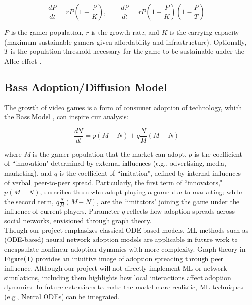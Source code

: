 \documentclass{article}
\begin{document}
\begin{equation}
    \frac{dP}{dt} = rP \left(1 - \frac{P}{K}\right), 
    \qquad \frac{dP}{dt} = rP \left(1 - \frac{P}{K}\right) \left(1 - \frac{P}{T}\right)
\end{equation}

\noindent $P$ is the gamer population, $r$ is the growth rate, and $K$ is the carrying capacity (maximum sustainable gamers given affordability and infrastructure). Optionally, $T$ is the population threshold necessary for the game to be sustainable under the Allee effect \cite{9b04f3dc-918b-391a-9a53-ddc05d360c66}.  

\subsection{Bass Adoption/Diffusion Model}
The growth of video games is a form of consumer adoption of technology, which the Bass Model \cite{916272ae-6b7a-3e62-b7e2-5747187dae7b, f1542a98-16de-3de1-ac28-c48c9779e63f}, can inspire our analysis: 

\begin{equation}
    \frac{dN}{dt} = p \left(M - N\right) + q \frac{N}{M} \left(M - N\right)
\end{equation}

\noindent where $M$ is the gamer population that the market can adopt, $p$ is the coefficient of ``innovation" determined by external influences (e.g., advertising, media, marketing), and $q$ is the coefficient of ``imitation", defined by internal influences of verbal, peer-to-peer spread. Particularly, the first term of ``innovators," $p \left(M - N\right)$, describes those who adopt playing a game due to marketing; while the second term, $ q \frac{N}{M} \left(M - N\right) $, are the ``imitators" joining the game under the influence of current players. Parameter $q$ reflects how adoption spreads across social networks, envisioned through graph theory. \\ 


\noindent Though our project emphasizes classical ODE-based models, ML methods such as (ODE-based) neural network adoption models are applicable in future work to encapsulate nonlinear adoption dynamics with more complexity. Graph theory in Figure\textbf{(1)} provides an intuitive image of adoption spreading through peer influence. Although our project will not directly implement ML or network simulations, including them highlights how local interactions affect adoption dynamics. In future extensions to make the model more realistic, ML techniques (e.g., Neural ODEs) can be integrated.
\end{document}
